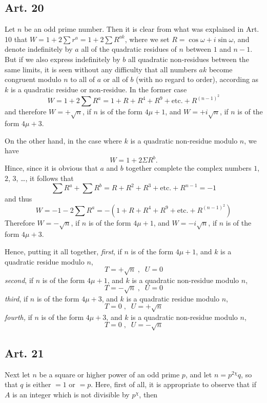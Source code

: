\documentclass{book}
\theoremstyle{plain}
\theoremstyle{remark}
\begin{document}
\subsection*{Art. 20} 

Let $n$ be an odd prime number.  Then it is clear from what was explained in Art. 10 that $W = 1 + 2 \sum r^a = 1 + 2 \sum R^{ak}$, where we set $R = \cos \omega + i \sin \omega$, and denote indefinitely by $a$ all of the quadratic residues of $n$ between $1$ and $n-1$.  But if we also express indefinitely by $b$ all quadratic non-residues between the same limits, it is seen without any difficulty that all numbers $ak$ become congruent modulo $n$ to all of $a$ or all of $b$ (with no regard to order), according as $k$ is a quadratic residue or non-residue.  In the former case  
\[ W = 1 + 2 \sum R^a = 1 + R + R^4 + R^9 + \textrm{etc.} + R^{(n-1)^2} \]
and therefore $W = +\sqrt{n}$, if $n$ is of the form $4\mu+1$, and $W = +i \sqrt{n}$, if $n$ is of the form $4\mu+3$. 

On the other hand, in the case where $k$ is a quadratic non-residue modulo $n$, we have 
\[ W = 1 + 2 \Sigma R^b . \]
Hince, since it is obvious that $a$ and $b$ together complete the complex numbers $1$, $2$, $3$, \dots, it follows that
\[ \sum R^a + \sum R^b = R + R^{2} + R^{3} + \textrm{etc.}+R^{n-1} = -1 \]
and thus
\[ W = -1 - 2\sum R^a = - \left(1 + R + R^4 + R^9 + \textrm{etc.} +R^{(n-1)^2} \right)\]
Therefore $W = -\sqrt{n}$, if $n$ is of the form $4\mu+1$, and $W = -i\sqrt{n}$, if $n$ is of the form $4\mu+3$. 

Hence, putting it all together,
\textit{first}, if $n$ is of the form $4\mu+1$, and $k$ is a quadratic residue modulo $n$,
\[ T = + \sqrt{n} \;,\;\; U = 0 \]
\textit{second}, if $n$ is of the form $4\mu+1$, and $k$ is a quadratic non-residue modulo $n$,
\[ T = - \sqrt{n}\; ,\; \; U=0 \]
\textit{third}, if $n$ is of the form $4\mu+3$, and $k$ is a quadratic residue modulo $n$,
\[ T = 0 \; , \; \; U = + \sqrt{n} \]
\textit{fourth,} if $n$ is of the form $4\mu+3$, and $k$ is a quadratic non-residue modulo $n$,
\[ T = 0 \;, \; \; U = -\sqrt{n} \]

\subsection*{Art. 21} 

Next let $n$ be a square or higher power of an odd prime $p$, and let $n=p^{2\chi}q$, so that $q$ is either $=1$ or $=p$.  Here, first of all, it is appropriate to observe that if $A$ is an integer which is not divisible by $p^{\chi}$, then 
\end{document}
